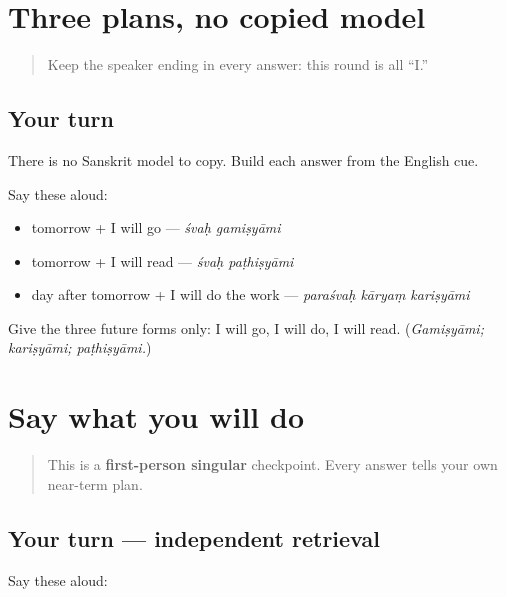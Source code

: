 \section[Practice]{Three plans, no copied model}

\label{lesson:SA-C264-mixed-plan-practice}



\begin{quote}
Keep the speaker ending in every answer: this round is all “I.”
\end{quote}

\subsection*{Your turn}
There is no Sanskrit model to copy. Build each answer from the English cue.

Say these aloud:

\begin{itemize}
\raggedright
  \item tomorrow + I will go — \emph{śvaḥ gamiṣyāmi}
  \item tomorrow + I will read — \emph{śvaḥ paṭhiṣyāmi}
  \item day after tomorrow + I will do the work — \emph{paraśvaḥ kāryaṃ kariṣyāmi}
\end{itemize}

\begin{tcolorbox}[breakable,colback=teal!4,colframe=teal!35!black,title={Before you move on}]
Give the three future forms only: I will go, I will do, I will read. (\emph{Gamiṣyāmi; kariṣyāmi; paṭhiṣyāmi.})
\end{tcolorbox}
\section[Practice]{Say what you will do}

\label{lesson:SA-C264-first-person-future-retrieval}



\begin{quote}
This is a \textbf{first-person singular} checkpoint. Every answer tells your own near-term plan.
\end{quote}

\subsection*{Your turn — independent retrieval}
Say these aloud:

